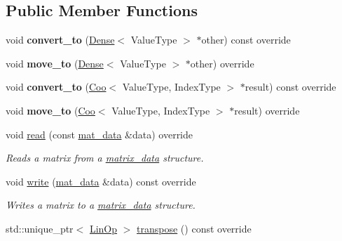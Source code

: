 \subsection*{Public Member Functions}
\begin{DoxyCompactItemize}
\item 
\mbox{\label{classgko_1_1matrix_1_1Csr_a610dfb71907ee0e79ca6470571cb1d10}} 
void {\bfseries convert\+\_\+to} (\hyperlink{classgko_1_1matrix_1_1Dense}{Dense}$<$ Value\+Type $>$ $\ast$other) const override
\item 
\mbox{\label{classgko_1_1matrix_1_1Csr_a794189da6f4443a991b7f68ed59c2f49}} 
void {\bfseries move\+\_\+to} (\hyperlink{classgko_1_1matrix_1_1Dense}{Dense}$<$ Value\+Type $>$ $\ast$other) override
\item 
\mbox{\label{classgko_1_1matrix_1_1Csr_ab0927bd9d5f77008d95891f266b9eb1d}} 
void {\bfseries convert\+\_\+to} (\hyperlink{classgko_1_1matrix_1_1Coo}{Coo}$<$ Value\+Type, Index\+Type $>$ $\ast$result) const override
\item 
\mbox{\label{classgko_1_1matrix_1_1Csr_a79c4a2730c1ef576d75fb8f2d98aecf2}} 
void {\bfseries move\+\_\+to} (\hyperlink{classgko_1_1matrix_1_1Coo}{Coo}$<$ Value\+Type, Index\+Type $>$ $\ast$result) override
\item 
void \hyperlink{classgko_1_1matrix_1_1Csr_ac4db41146ed3c3a8653b03d6b2c6c675}{read} (const \hyperlink{structgko_1_1matrix__data}{mat\+\_\+data} \&data) override
\begin{DoxyCompactList}\small\item\em Reads a matrix from a \hyperlink{structgko_1_1matrix__data}{matrix\+\_\+data} structure. \end{DoxyCompactList}\item 
void \hyperlink{classgko_1_1matrix_1_1Csr_a205fc391f4cf4f7718a55b0a61f62bc9}{write} (\hyperlink{structgko_1_1matrix__data}{mat\+\_\+data} \&data) const override
\begin{DoxyCompactList}\small\item\em Writes a matrix to a \hyperlink{structgko_1_1matrix__data}{matrix\+\_\+data} structure. \end{DoxyCompactList}\item 
std\+::unique\+\_\+ptr$<$ \hyperlink{classgko_1_1LinOp}{Lin\+Op} $>$ \hyperlink{classgko_1_1matrix_1_1Csr_ab79e609214d6b4834d5961ee0a7d3519}{transpose} () const override

\end{DoxyCompactItemize}
